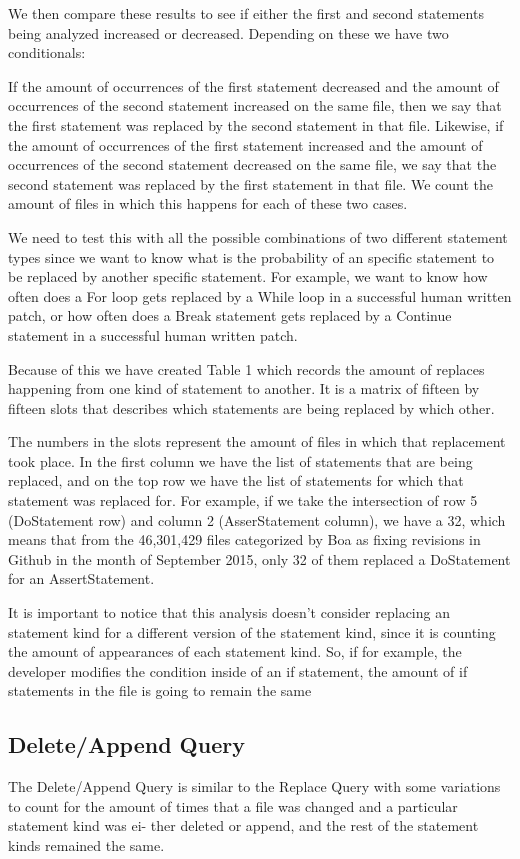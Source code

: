 \documentclass{sig-alternate-05-2015}
\begin{document}
We then compare these results to see if either the first and second statements
being analyzed increased or decreased. Depending on these we have two
conditionals:

If the amount of occurrences of the first statement decreased and the amount of
occurrences of the second statement increased on the same file, then we say that
the first statement was replaced by the second statement in that file. Likewise,
if the amount of occurrences of the first statement increased and the amount of
occurrences of the second statement decreased on the same file, we say that the
second statement was replaced by the first statement in that file. We count the
amount of files in which this happens for each of these two cases.

We need to test this with all the possible combinations of two different
statement types since we want to know what is the probability of an specific
statement to be replaced by another specific statement. For example, we want to
know how often does a For loop gets replaced by a While loop in a successful
human written patch, or how often does a Break statement gets replaced by a
Continue statement in a successful human written patch.

Because of this we have created Table 1 which records the amount of replaces happening from one kind of statement to another. It is a matrix of fifteen by fifteen slots that describes which statements are being replaced by which other. 

The numbers in the slots represent the amount of files in which that replacement took place. In the first column we have the list of statements that are being replaced, and on the top row we have the list of statements for which that statement was replaced for. For example, if we take the intersection of row 5 (DoStatement row) and column 2 (AsserStatement column), we have a 32, which means that from the 46,301,429 files categorized by Boa as fixing revisions in Github in the month of September 2015, only 32 of them replaced a DoStatement for an AssertStatement.

It is important to notice  that this analysis doesn't consider replacing an statement kind for a different version of the statement kind, since it is counting the amount of appearances of each statement kind. So, if for example, the developer modifies the condition inside of an if statement, the amount of if statements in the file is going to remain the same

\subsection{Delete/Append Query}
The Delete/Append Query is similar to the Replace Query with some variations to
count for the amount of times that a file was changed and a particular statement
kind was ei- ther deleted or append, and the rest of the statement kinds
remained the same.
\end{document}
